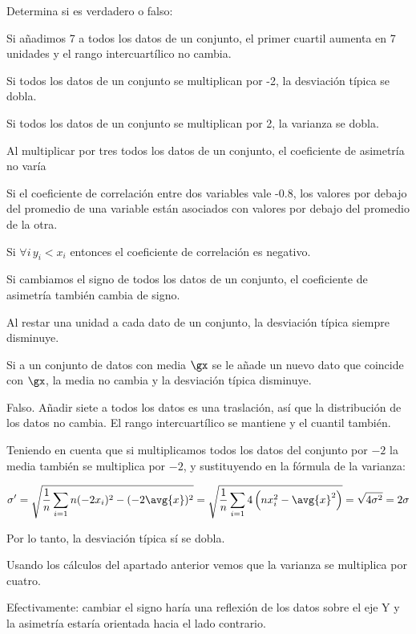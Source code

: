 \begin{problem}[5]Determina si es verdadero o falso:

\ppart Si añadimos 7 a todos los datos de un conjunto, el primer cuartil aumenta en 7 unidades y el rango intercuartílico no cambia.

\ppart Si todos los datos de un conjunto se multiplican por -2, la desviación típica se dobla.

\ppart Si todos los datos de un conjunto se multiplican por 2, la varianza se dobla.

\ppart Al multiplicar por tres todos los datos de un conjunto, el coeficiente de asimetría no varía

\ppart Si el coeficiente de correlación entre dos variables vale -0.8, los valores por debajo del promedio de una variable están asociados con valores por debajo del promedio de la otra.

\ppart Si $\forall i\,y_i<x_i$ entonces el coeficiente de correlación es negativo.


\ppart Si cambiamos el signo de todos los datos de un conjunto, el coeficiente de asimetría también cambia de signo.

\ppart Al restar una unidad a cada dato de un conjunto, la desviación típica siempre disminuye.

\ppart Si a un conjunto de datos con media $\gx$ se le añade un nuevo dato que coincide con $\gx$, la
media no cambia y la desviación típica disminuye.

\solution 

\spart Falso. Añadir siete a todos los datos es una traslación, así que la distribución de los datos no cambia. El rango intercuartílico se mantiene y el cuantil también.

\spart Teniendo en cuenta que si multiplicamos todos los datos del conjunto por $-2$ la media también se multiplica por $-2$, y sustituyendo en la fórmula de la varianza:

\[ \sigma' = \sqrt{\frac{1}{n} \sum_{i=1}n (-2x_i)^2 - (-2\avg{x})^2} = \sqrt{\frac{1}{n} \sum_{i=1}4\left(n x_i^2 - \avg{x}^2\right)} = \sqrt{4\sigma^2} = 2\sigma \]

Por lo tanto, la desviación típica sí se dobla.

\spart Usando los cálculos del apartado anterior vemos que la varianza se multiplica por cuatro.

\spart Efectivamente: cambiar el signo haría una reflexión de los datos sobre el eje Y y la asimetría estaría orientada hacia el lado contrario. 


\end{problem}
